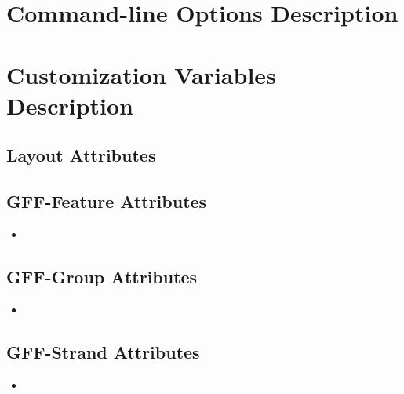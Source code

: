\documentclass[11pt]{article}
\newcommand{\sctn}[1]{\section{#1}}
\newcommand{\subsctn}[1]{\subsection{#1}}
\def\prog{\textsc{\textbf{gff2aplot}}}
\begin{document}
\tableofcontents

\listoffigures

\listoftables


\newpage
{}
\setcounter{page}{1}

%
% 

%
% 

%
% 

%
% 

%
% 

%
% 


\sctn{Command-line Options Description}


 \begin{itemize}
 \end{itemize}

\newpage

\sctn{Customization Variables Description}


\subsctn{Layout Attributes}

 \begin{itemize}
  
 \end{itemize}

\subsctn{GFF-Feature Attributes}

 \begin{itemize}
  
  \item 
 \end{itemize}

\subsctn{GFF-Group Attributes}

 \begin{itemize}
  
  \item 
 \end{itemize}

\subsctn{GFF-Strand Attributes}

 \begin{itemize}
  
  \item 
 \end{itemize}
\end{document}
